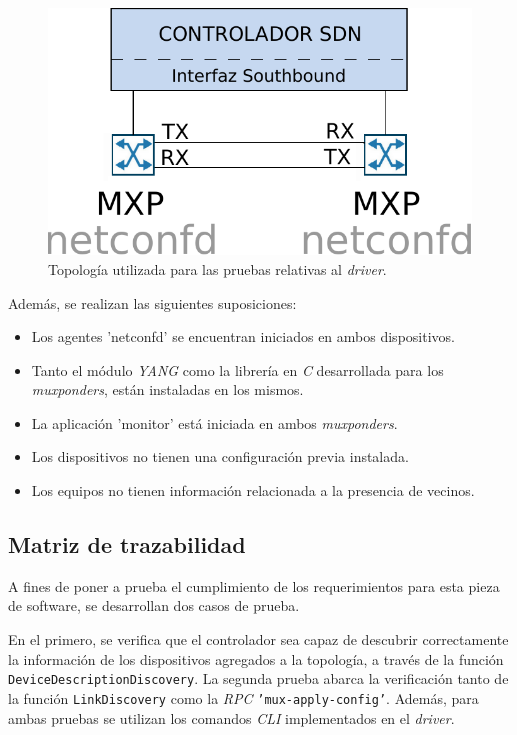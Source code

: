 \begin{figure}[!h]
	\centering
	\includegraphics[scale=0.8]{Figures/topologiatestdriver.pdf}
	\caption{Topología utilizada para las pruebas relativas al \textit{driver}.}
	\label{fig:test_topo_driver}
  \end{figure}


  Además, se realizan las siguientes suposiciones:

\begin{itemize}
	\item Los agentes 'netconfd' se encuentran iniciados en ambos dispositivos.
    \item Tanto el módulo \textit{YANG} como la librería en \textit{C} desarrollada para los \textit{muxponders}, están instaladas en los mismos.
    \item La aplicación 'monitor' está iniciada en ambos \textit{muxponders}.
    \item Los dispositivos no tienen una configuración previa instalada. 
    \item Los equipos no tienen información relacionada a la presencia de vecinos.
\end{itemize}

\subsection{Matriz de trazabilidad}

A fines de poner a prueba el cumplimiento de los requerimientos para esta pieza de software, se desarrollan dos casos de prueba. 

En el primero, se verifica que el controlador sea capaz de descubrir correctamente la información de los dispositivos agregados a la topología, a través de la función \texttt{DeviceDescriptionDiscovery}. La segunda prueba abarca la verificación tanto de la función \texttt{LinkDiscovery} como la  \textit{RPC} \texttt{'mux-apply-config'}. Además, para ambas pruebas se utilizan los comandos \textit{CLI} implementados en el \textit{driver}.

